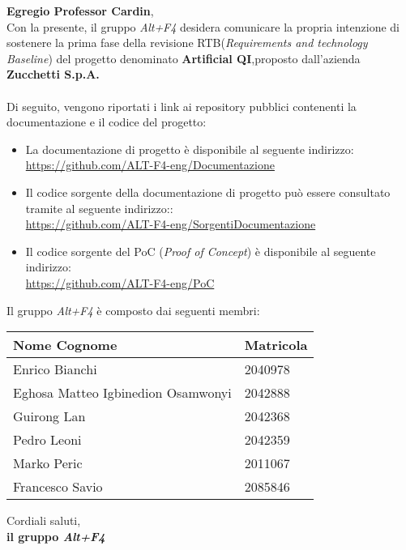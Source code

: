 \documentclass[a4paper, 12pt]{article}
\begin{document}
\primapagina

\newpage

\noindent
\textbf{Egregio Professor Cardin}, \\
Con la presente, il gruppo \textit{Alt+F4} desidera comunicare la propria intenzione di sostenere la prima fase della revisione RTB(\textit{Requirements and technology Baseline}) del progetto denominato \textbf{Artificial QI},proposto dall'azienda  \textbf{Zucchetti S.p.A.}\\
\\
Di seguito, vengono riportati i link ai repository pubblici contenenti la documentazione e il codice del progetto:
\begin{itemize}

\item La documentazione di progetto è disponibile al seguente indirizzo: \\ 
\href{https://github.com/ALT-F4-eng/Documentazione}{https://github.com/ALT-F4-eng/Documentazione}\\


\item Il codice sorgente della documentazione di progetto può essere consultato tramite al seguente indirizzo::\\
\href{https://github.com/ALT-F4-eng/SorgentiDocumentazione}{https://github.com/ALT-F4-eng/SorgentiDocumentazione}\\


\item Il codice sorgente del PoC (\textit{Proof of Concept}) è disponibile al seguente indirizzo:\\
\href{https://github.com/ALT-F4-eng/PoC}{https://github.com/ALT-F4-eng/PoC}

\end{itemize}

\noindent
Il gruppo \textit{Alt+F4} è composto dai seguenti membri:
\begin{table}[H]
    \centering
    \begin{tabular}{| l | l |}
    \hline
    \textbf{Nome Cognome} & 
    \textbf{Matricola}\\ 
        \hline
            Enrico Bianchi&
            2040978 \\
        \hline 
            Eghosa Matteo Igbinedion Osamwonyi&
            2042888 \\
        \hline 
            Guirong Lan&
            2042368 \\
        \hline 
            Pedro Leoni&
            2042359 \\
        \hline 
            Marko Peric&
            2011067 \\
        \hline 
            Francesco Savio&
            2085846 \\
        \hline 
    \end{tabular}
\end{table}
\noindent
Cordiali saluti,\\
\textbf{il gruppo \textit{Alt+F4}}
\end{document}
